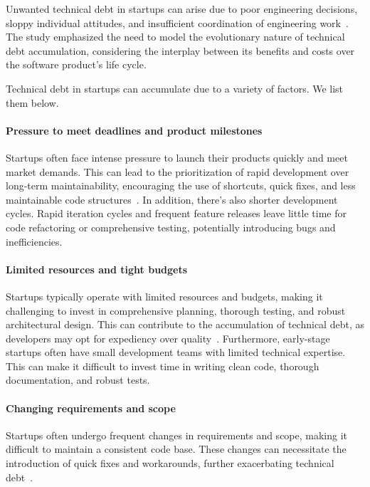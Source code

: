 Unwanted technical debt in startups can arise due to poor engineering decisions, sloppy individual attitudes, and insufficient coordination of engineering work~\cite{Klotins882019}.
The study emphasized the need to model the evolutionary nature of technical debt accumulation, considering the interplay between its benefits and costs over the software product's life cycle.

Technical debt in startups can accumulate due to a variety of factors. We list them below.

\paragraph{Pressure to meet deadlines and product milestones}
Startups often face intense pressure to launch their products quickly and meet market demands.
This can lead to the prioritization of rapid development over long-term maintainability, encouraging the use of shortcuts, quick fixes, and less maintainable code structures~\cite{Klotins:2018:ETD,Qualityv77:online}.
In addition, there's also shorter development cycles.
Rapid iteration cycles and frequent feature releases leave little time for code refactoring or comprehensive testing, potentially introducing bugs and inefficiencies.

\paragraph{Limited resources and tight budgets}
Startups typically operate with limited resources and budgets, making it challenging to invest in comprehensive planning, thorough testing, and robust architectural design.
This can contribute to the accumulation of technical debt, as developers may opt for expediency over quality~\cite{FowlerBottlenecks,Balancin62:online}.
Furthermore, early-stage startups often have small development teams with limited technical expertise.
This can make it difficult to invest time in writing clean code, thorough documentation, and robust tests.

\paragraph{Changing requirements and scope}
Startups often undergo frequent changes in requirements and scope, making it difficult to maintain a consistent code base.
These changes can necessitate the introduction of quick fixes and workarounds, further exacerbating technical debt~\cite{DesignSt86:online,Creating18:online}.

